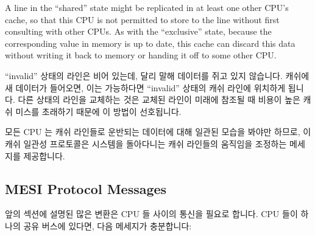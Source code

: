 A line in the ``shared'' state might be replicated in at least
one other CPU's cache, so that this CPU is not permitted to store
to the line without first consulting with other CPUs.
As with the ``exclusive'' state, because the corresponding value
in memory is up to date,
this cache can discard this data without writing it back to memory
or handing it off to some other CPU\@.

\fi

``invalid'' 상태의 라인은 비어 있는데, 달리 말해 데이터를 쥐고 있지 않습니다.
캐쉬에 새 데이터가 들어오면, 이는 가능하다면 ``invalid'' 상태의 캐쉬 라인에
위치하게 됩니다.
다른 상태의 라인을 교체하는 것은 교체된 라인이 미래에 참조될 때 비용이 높은
캐쉬 미스를 초래하기 때문에 이 방법이 선호됩니다.

모든 CPU 는 캐쉬 라인들로 운반되는 데이터에 대해 일관된 모습을 봐야만 하므로,
이 캐쉬 일관성 프로토콜은 시스템을 돌아다니는 캐쉬 라인들의 움직임을 조정하는
메세지를 제공합니다.

\iffalse

A line in the ``invalid'' state is empty, in other words, it holds
no data.
When new data enters the cache, it is placed into a
cache line that was in the ``invalid'' state if possible.
This approach is preferred because replacing a line in any other
state could result in an expensive cache miss should the replaced
line be referenced in the future.

Since all CPUs must maintain a coherent view of the data carried in
the cache lines, the cache-coherence protocol provides messages
that coordinate the movement of cache lines through the system.

\fi

\subsection{MESI Protocol Messages}
\label{sec:app:whymb:MESI Protocol Messages}

앞의 섹션에 설명된 많은 변환은 CPU 들 사이의 통신을 필요로 합니다.
CPU 들이 하나의 공유 버스에 있다면, 다음 메세지가 충분합니다:

\iffalse

Many of the transitions described in the previous section require
communication among the CPUs.
If the CPUs are on a single shared bus, the following messages suffice:

\fi

